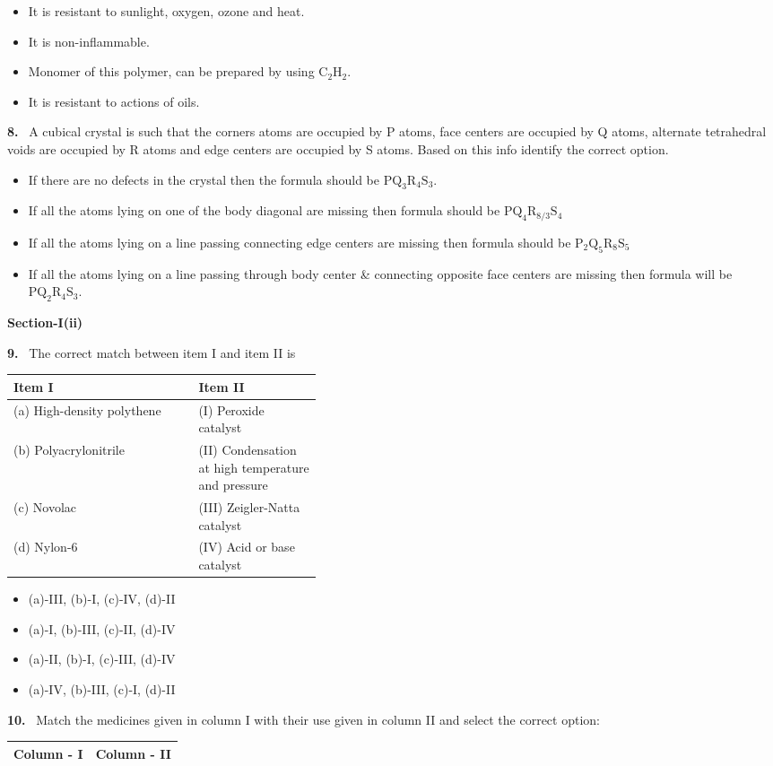 \documentclass[10pt]{extarticle}
\newcommand{\sect}[1]{\par\smallskip\noindent\textbf{#1}\par}
\newcommand{\qn}[1]{\par\smallskip\noindent\textbf{#1.}~}
\newenvironment{qoptions}{\begin{itemize}[leftmargin=1.8em,itemsep=1pt,topsep=2pt,label={}]}{\end{itemize}}
\newcommand{\opt}[2]{\item[(#1)] #2}
\begin{document}
\begin{multicols}{2}
\begin{qoptions}
\opt{A}{It is resistant to sunlight, oxygen, ozone and heat.}
\opt{B}{It is non-inflammable.}
\opt{C}{Monomer of this polymer, can be prepared by using $\mathrm{C_2H_2}$.}
\opt{D}{It is resistant to actions of oils.}
\end{qoptions}
\qn{8} A cubical crystal is such that the corners atoms are occupied by P atoms, face centers are occupied by Q atoms, alternate tetrahedral voids are occupied by R atoms and edge centers are occupied by S atoms. Based on this info identify the correct option.
\begin{qoptions}
\opt{A}{If there are no defects in the crystal then the formula should be $\mathrm{PQ_3R_4S_3}$.}
\opt{B}{If all the atoms lying on one of the body diagonal are missing then formula should be $\mathrm{PQ_4R_{8/3}S_4}$}
\opt{C}{If all the atoms lying on a line passing connecting edge centers are missing then formula should be $\mathrm{P_2Q_5R_8S_5}$}
\opt{D}{If all the atoms lying on a line passing through body center \& connecting opposite face centers are missing then formula will be $\mathrm{PQ_2R_4S_3}$.}
\end{qoptions}
\sect{Section-I(ii)}
\qn{9} The correct match between item I and item II is
\begin{center}\small
\begin{tabular}{|l|p{0.4\linewidth}|}\hline
\textbf{Item I} & \textbf{Item II}\\\hline
(a) High-density polythene & (I) Peroxide catalyst\\\hline
(b) Polyacrylonitrile & (II) Condensation at high temperature and pressure\\\hline
(c) Novolac & (III) Zeigler-Natta catalyst\\\hline
(d) Nylon-6 & (IV) Acid or base catalyst\\\hline
\end{tabular}
\end{center}
\begin{qoptions}
\opt{A}{(a)-III, (b)-I, (c)-IV, (d)-II}
\opt{B}{(a)-I, (b)-III, (c)-II, (d)-IV}
\opt{C}{(a)-II, (b)-I, (c)-III, (d)-IV}
\opt{D}{(a)-IV, (b)-III, (c)-I, (d)-II}
\end{qoptions}
\qn{10} Match the medicines given in column I with their use given in column II and select the correct option:
\begin{center}\small
\begin{tabular}{|l|l||l|l|}\hline
\multicolumn{2}{|c||}{\textbf{Column - I}} & \multicolumn{2}{c|}{\textbf{Column - II}}\\\hline

\end{tabular}
\end{center}
\end{multicols}
\end{document}
